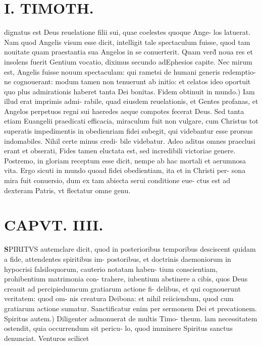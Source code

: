 \documentclass{article}
\begin{document}
\begin{pages}
\section*{I. TIMOTH. }
\marginpar{[ p.41 ]}\pstart dignatus est Deus reuelatione filii sui, quae coelestes quoque Ange- los latuerat. Nam quod Angelis visum esse dicit, intelligit tale spectaculum fuisse, quod tam nouitate quam praestantia sua Angelos in se conuerterit. Quam verd̀ noua res et insolens fuerit Gentium vocatio, diximus secundo adEphesios capite. Nec mirum est, Angelis fuisse nouum spectaculam: qui rametsi de humani generis redemptio- ne cognouerant: modum tamen non tenuerunt ab initio: et celatos ideo oportuit quo plus admirationis haberet tanta Dei bonitas.  \pend\pstart Fidem obtinuit in mundo.) Iam illud erat imprimis admi- rabile, quad eiusdem reuelationis, et Gentes profanas, et Angelos perpetuos regni sui haeredes aeque compotes fecerat Deus. Sed tanta etiam Euangelii praedicati efficacia, miraculum fuit non vulgare, cum Christus tot superatis impedimentis in obedienriam fidei subegit, qui videbantur esse prorsus indomabiles. Nihil certe minus credi- bile videbatur. Adeo aditus omnes praeclusi erant et obserati, Fides tamen eluctata est, sed incredibili victoriae genere. Postremo, in gloriam receptum esse dicit, nempe ab hac mortali et aerumnosa vita. Ergo sicuti in mundo quoad fidei obedientiam, ita et in Christi per- sona mira fuit conuersio, dum ex tam abiecta serui conditione eue- ctus est ad dexteram Patris, vt flectatur omne genu.  \pend
\endnumbering\beginnumbering\section{CAPVT. IIII.}\pstart \huge\textbf{S}\normalsize PIRITVS autemclare dicit, quod in posterioribus temporibus desciscent quidam a fide, attendentes spiritibus im- postoribus, et doctrinis daemoniorum in hypocrisi falsiloquorum, cauterio notatam haben- tium conscientiam, prohibentium matrimonia con- trahere, iubentium abstinere a cibis, quos Deus creauit ad percipiedumcum gratiarum actione fi- delibus, et qui cognouerunt veritatem: quod om- nis creatura Deibona: et nihil reiiciendum, quod cum gratiarum actione sumatur. Sanctificatur enim per sermonem Dei et precationem.  \pend\pstart Spiritus autem.) Diligenter admonuerat de multis Timo- theum. lam necessitatem ostendit, quia occurrendum sit pericu- lo, quod imminere Spiritus sanctus denunciat. Venturos scilicet  \pend
{}
{}
\subsection*{\textit{}}

\end{pages}
\end{document}
